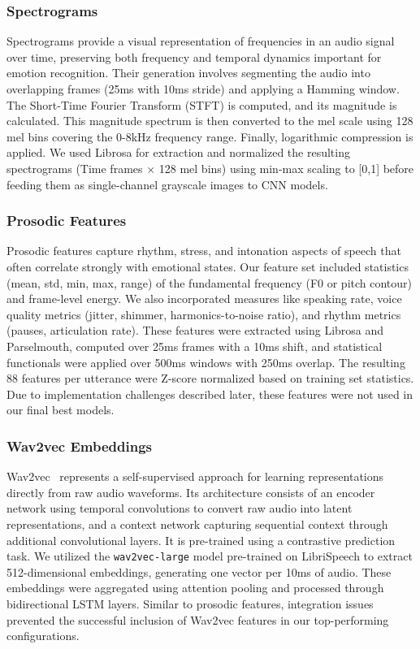 \documentclass[12pt]{article}
\begin{document}
\subsubsection{Spectrograms}
Spectrograms provide a visual representation of frequencies in an audio signal over time, preserving both frequency and temporal dynamics important for emotion recognition. Their generation involves segmenting the audio into overlapping frames (25ms with 10ms stride) and applying a Hamming window. The Short-Time Fourier Transform (STFT) is computed, and its magnitude is calculated. This magnitude spectrum is then converted to the mel scale using 128 mel bins covering the 0-8kHz frequency range. Finally, logarithmic compression is applied. We used Librosa for extraction and normalized the resulting spectrograms (Time frames × 128 mel bins) using min-max scaling to [0,1] before feeding them as single-channel grayscale images to CNN models.

\subsubsection{Prosodic Features}
Prosodic features capture rhythm, stress, and intonation aspects of speech that often correlate strongly with emotional states. Our feature set included statistics (mean, std, min, max, range) of the fundamental frequency (F0 or pitch contour) and frame-level energy. We also incorporated measures like speaking rate, voice quality metrics (jitter, shimmer, harmonics-to-noise ratio), and rhythm metrics (pauses, articulation rate). These features were extracted using Librosa and Parselmouth, computed over 25ms frames with a 10ms shift, and statistical functionals were applied over 500ms windows with 250ms overlap. The resulting 88 features per utterance were Z-score normalized based on training set statistics. Due to implementation challenges described later, these features were not used in our final best models.

\subsubsection{Wav2vec Embeddings}
Wav2vec~\cite{schneider2019wav2vec} represents a self-supervised approach for learning representations directly from raw audio waveforms. Its architecture consists of an encoder network using temporal convolutions to convert raw audio into latent representations, and a context network capturing sequential context through additional convolutional layers. It is pre-trained using a contrastive prediction task. We utilized the \texttt{wav2vec-large} model pre-trained on LibriSpeech to extract 512-dimensional embeddings, generating one vector per 10ms of audio. These embeddings were aggregated using attention pooling and processed through bidirectional LSTM layers. Similar to prosodic features, integration issues prevented the successful inclusion of Wav2vec features in our top-performing configurations.
\end{document}
